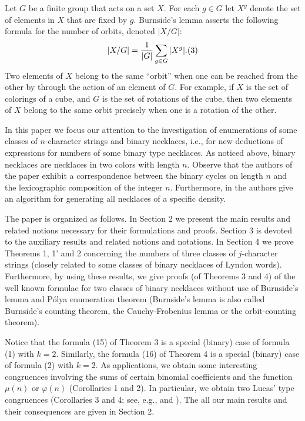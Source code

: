 \documentclass[12pt]{amsart}
\begin{document}
{Let $G$ be a finite group that acts on a set $X$. For each $g\in G$ let 
$X^g$ denote the set of elements in $X$ that are fixed by $g$. Burnside's 
lemma asserts the following formula for the number of orbits, denoted 
$|X/G|$:
  $$
|X/G|=\frac{1}{|G|}\sum_{g\in G}|X^g|.\relax(3)
  $$
Two elements of $X$ belong to the same ``orbit'' when one can be reached from 
the other by through the action of an element of $G$. For example,
if $X$ is the set of colorings of a cube, and
$G$ is the set of rotations of the cube, then two elements of  $X$ belong to
the same orbit precisely when one is a rotation of the other.
  
In this paper  we focus our attention to the investigation of enumerations of 
some classes of $n$-character strings and   binary   necklaces, i.e., for 
new deductions of expressions for numbers of some binary  type necklaces. 
As noticed above,  
 binary necklaces are necklaces  in two colors with length 
$n$. Observe that the authors of the paper \cite{fk} exhibit 
a correspondence between the binary cycles on length $n$ and the lexicographic
composition of the integer $n$. Furthermore, in \cite{fk} the authors give
an algorithm for generating all necklaces of a specific density. 
   
The paper is organized as follows. In Section 2 we present the main results 
and related notions necessary for their formulations and proofs.
Section 3 is devoted to the auxiliary results and related notions 
and notations. 
In  Section 4 we 
prove Theorems 1, 1' and  2
 concerning the numbers of three classes of $j$-character strings
(closely related to some classes of binary necklaces of Lyndon words).
Furthermore, by using these results, we give   proofs (of Theorems 3 and 4)   
of the well known formulae for  two classes of  binary 
necklaces without use of Burnside's lemma  and P\'olya enumeration theorem
  (Burnside's lemma is also called 
Burnside's counting theorem, the Cauchy-Frobenius lemma or the 
orbit-counting theorem).

 Notice that the formula (15) of Theorem 3
is a special (binary) case of formula (1)  with $k=2$. Similarly, 
the formula (16)   of Theorem 4 is a special (binary) case of formula (2) 
with $k=2$.  As applications, we obtain some interesting 
congruences involving the sums of certain binomial coefficients 
and the function $\mu(n)$ or $\varphi(n)$ (Corollaries 1 and 2).
 In particular, we obtain two Lucas' type congruences (Corollaries 3 and 4;
see, e.g., \cite{m} and  \cite{m2}). 
The all our main results and their consequences  are given in Section 2.
  
}
\end{document}
